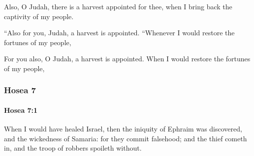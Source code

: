 			\begin{versebox}
					\item[BHS] 
					\item[LXX] 
					\item[ASV] Also, O Judah, there is a harvest appointed for thee, when I bring back the captivity of my people.
					\item[NIV] “Also for you, Judah, a harvest is appointed. “Whenever I would restore the fortunes of my people,
					\item[NRSV] For you also, O Judah, a harvest is appointed. When I would restore the fortunes of my people,
			\end{versebox}
	\subsubsection{Hosea 7} %
		\label{HOSEA-7}

		\paragraph{Hosea 7:1} %
			\label{HOSEA-7-1}

			When I would have healed Israel, then the iniquity of Ephraim was discovered, and the wickedness of Samaria: for they commit falsehood; and the thief cometh in, and the troop of robbers spoileth without.

